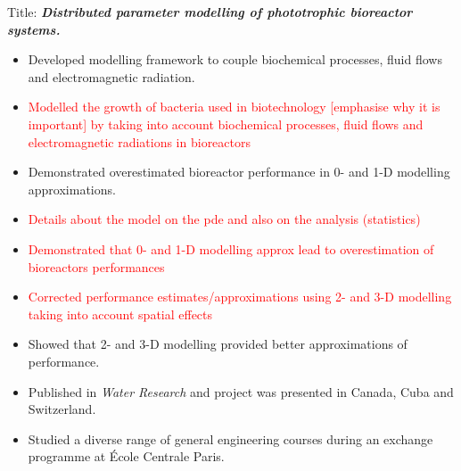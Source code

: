 \vspace{0.2mm}
Title: \textbf{\textit{Distributed parameter modelling of phototrophic bioreactor systems.}}
\begin{itemize}
    \item Developed modelling framework to couple biochemical processes, fluid flows and electromagnetic radiation.
    \item \textcolor{red}{Modelled the growth of bacteria used in biotechnology [emphasise why it is important] by taking into account biochemical processes, fluid flows and electromagnetic radiations in bioreactors }
    \item Demonstrated overestimated bioreactor performance in 0- and 1-D modelling approximations. 
    \item \textcolor{red}{Details about the model on the pde and also on the analysis (statistics)}
    \item \textcolor{red}{Demonstrated that 0- and 1-D modelling approx lead to overestimation of bioreactors performances}
    \item \textcolor{red}{Corrected performance estimates/approximations using 2- and 3-D modelling taking into account spatial effects}
    \item Showed that 2- and 3-D modelling provided better approximations of performance.
    \item Published in \textit{Water Research} and project was presented in Canada, Cuba and Switzerland. 
\end{itemize}
\divider\smallskip


\begin{itemize}
\item Studied a diverse range of general engineering courses during an exchange programme at \'Ecole Centrale Paris.
\end{itemize}


